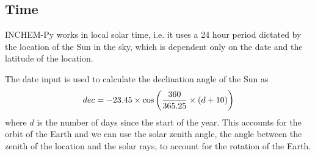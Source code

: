\documentclass[a4paper]{refart}
\begin{document}
\subsection{Time}
INCHEM-Py works in local solar time, i.e. it uses a 24 hour period dictated by the location of the Sun in the sky, which is dependent only on the date and the latitude of the location.

The date input is used to calculate the declination angle of the Sun as
\begin{equation}\index{declination angle}
    dec = -23.45 \times \cos\left(\frac{360}{365.25}\times (d+10)\right)
\end{equation}
where $d$ is the number of days since the start of the year. This accounts for the orbit of the Earth and we can use the solar zenith angle, the angle between the zenith of the location and the solar rays, to account for the rotation of the Earth.
\end{document}
